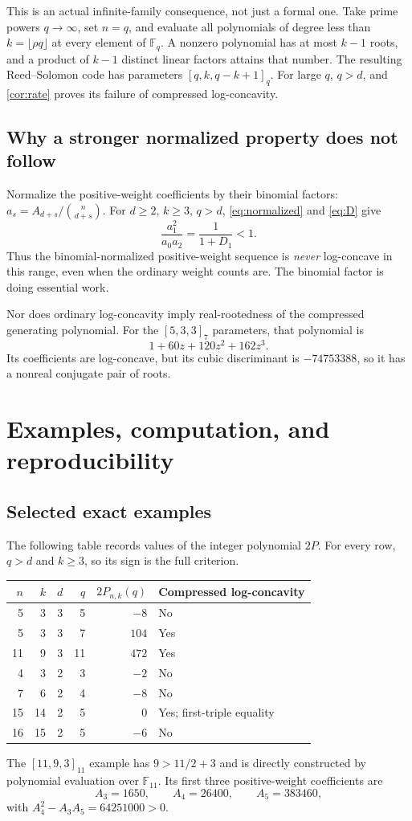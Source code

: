 \documentclass[11pt,letterpaper]{article}
\numberwithin{equation}{section}
\theoremstyle{definition}
\newcommand{\F}{\mathbb F}
\begin{document}
This is an actual infinite-family consequence, not just a formal
one. Take prime powers $q\to\infty$, set $n=q$, and evaluate all
polynomials of degree less than $k=\lfloor\rho q\rfloor$ at every
element of $\F_q$. A nonzero polynomial has at most $k-1$ roots,
and a product of $k-1$ distinct linear factors attains that number.
The resulting Reed--Solomon code has parameters $[q,k,q-k+1]_q$.
For large $q$, $q>d$, and \cref{cor:rate} proves its failure of
compressed log-concavity.

\subsection{Why a stronger normalized property does not follow}
Normalize the positive-weight coefficients by their binomial factors:
$a_s=A_{d+s}/\binom n{d+s}$. For $d\ge2$, $k\ge3$, $q>d$,
\eqref{eq:normalized} and \eqref{eq:D} give
\[
 \frac{a_1^2}{a_0a_2}=\frac{1}{1+D_1}<1.
\]
Thus the binomial-normalized positive-weight sequence is \emph{never}
log-concave in this range, even when the ordinary weight counts are.
The binomial factor is doing essential work.

Nor does ordinary log-concavity imply real-rootedness of the
compressed generating polynomial. For the $[5,3,3]_7$ parameters,
that polynomial is
\[
 1+60z+120z^2+162z^3.
\]
Its coefficients are log-concave, but its cubic discriminant is
$-74753388$, so it has a nonreal conjugate pair of roots.

\section{Examples, computation, and reproducibility}

\subsection{Selected exact examples}
The following table records values of the integer polynomial $2P$.
For every row, $q>d$ and $k\ge3$, so its sign is the full criterion.
\begin{center}
\begin{tabular}{@{}rrrrrl@{}}
\toprule
$n$ & $k$ & $d$ & $q$ & $2P_{n,k}(q)$ & Compressed log-concavity\\
\midrule
5 & 3 & 3 & 5 & $-8$ & No\\
5 & 3 & 3 & 7 & $104$ & Yes\\
11 & 9 & 3 & 11 & $472$ & Yes\\
4 & 3 & 2 & 3 & $-2$ & No\\
7 & 6 & 2 & 4 & $-8$ & No\\
15 & 14 & 2 & 5 & $0$ & Yes; first-triple equality\\
16 & 15 & 2 & 5 & $-6$ & No\\
\bottomrule
\end{tabular}
\end{center}
The $[11,9,3]_{11}$ example has $9>11/2+3$ and is directly
constructed by polynomial evaluation over $\F_{11}$. Its first
three positive-weight coefficients are
\[
 A_3=1650,\qquad A_4=26400,\qquad A_5=383460,
\]
with $A_4^2-A_3A_5=64251000>0$.
\end{document}
